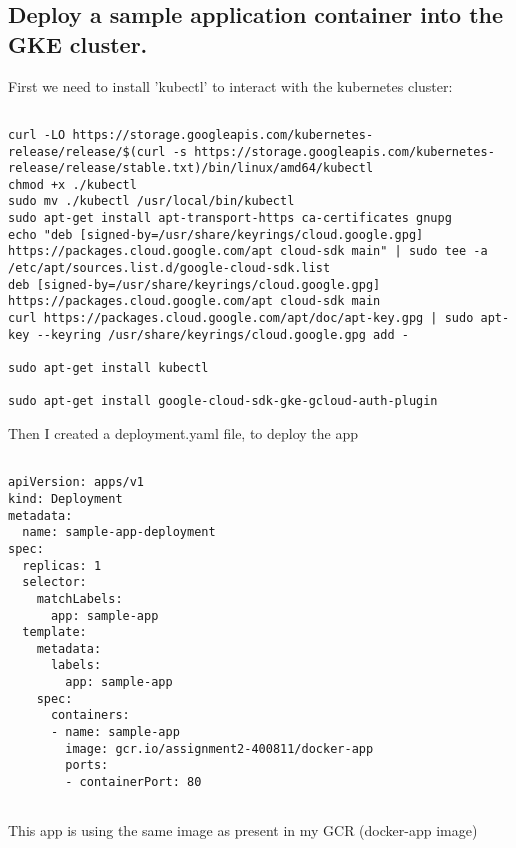 \documentclass[12pt]{article}
\begin{document}
\subsection{ Deploy a sample application container into the GKE cluster.}

First we need to install 'kubectl' to interact with the kubernetes cluster:

\begin{listing}[htbp]
\begin{verbatim}

curl -LO https://storage.googleapis.com/kubernetes-release/release/$(curl -s https://storage.googleapis.com/kubernetes-release/release/stable.txt)/bin/linux/amd64/kubectl
chmod +x ./kubectl
sudo mv ./kubectl /usr/local/bin/kubectl
sudo apt-get install apt-transport-https ca-certificates gnupg
echo "deb [signed-by=/usr/share/keyrings/cloud.google.gpg] https://packages.cloud.google.com/apt cloud-sdk main" | sudo tee -a /etc/apt/sources.list.d/google-cloud-sdk.list
deb [signed-by=/usr/share/keyrings/cloud.google.gpg] https://packages.cloud.google.com/apt cloud-sdk main
curl https://packages.cloud.google.com/apt/doc/apt-key.gpg | sudo apt-key --keyring /usr/share/keyrings/cloud.google.gpg add -

sudo apt-get install kubectl

sudo apt-get install google-cloud-sdk-gke-gcloud-auth-plugin

\end{verbatim}
\end{listing}

Then I created a deployment.yaml file, to deploy the app 

\begin{listing}[H]
\begin{verbatim}

apiVersion: apps/v1
kind: Deployment
metadata:
  name: sample-app-deployment
spec:
  replicas: 1
  selector:
    matchLabels:
      app: sample-app
  template:
    metadata:
      labels:
        app: sample-app
    spec:
      containers:
      - name: sample-app
        image: gcr.io/assignment2-400811/docker-app  
        ports:
        - containerPort: 80


\end{verbatim}
\end{listing}

This app is using the same image as present in my GCR (docker-app image)
\end{document}
